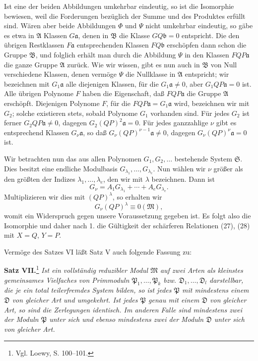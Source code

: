 \documentclass[11pt]{article}
\newcommand{\mM}{\mathfrak{M}}
\newcommand{\mA}{\mathfrak{A}}
\newcommand{\mB}{\mathfrak{B}}
\newcommand{\ma}{\mathfrak{a}}
\newcommand{\mb}{\mathfrak{b}}
\newcommand{\mP}{\mathfrak{P}}
\newcommand{\mS}{\mathfrak{S}}
\newcommand{\mD}{\mathfrak{D}}
\begin{document}
Ist eine der beiden Abbildungen umkehrbar eindeutig, so ist die Isomorphie bewiesen, weil die Forderungen bezüglich der Summe und des Produktes erfüllt sind. Wären aber beide Abbildungen $\Phi$ und $\Psi$ nicht umkehrbar eindeutig, so gäbe es etwa in $\mA$ Klassen $G\ma$, denen in $\mB$ die Klasse $GQ\mb=0$ entspricht. Die den übrigen Restklassen $F\ma$ entsprechenden Klassen $FQ\mb$ erschöpfen dann schon die Gruppe $\mB$, und folglich erhält man durch die Abbildung $\Psi$ in den Klassen $FQP\ma$ die ganze Gruppe $\mA$ zurück. Wie wir wissen, gibt es nun auch in $\mB$ von Null verschiedene Klassen, denen vermöge $\Psi$ die Nullklasse in $\mA$ entspricht; wir bezeichnen mit $G_1\ma$ alle diejenigen Klassen, für die $G_1\ma\ne0$, aber $G_1QP\ma=0$ ist. Alle übrigen Polynome $F$ haben die Eigenschaft, daß $FQP\ma$ die Gruppe $\mA$ erschöpft. Diejenigen Polynome $F$, für die $FQP\ma=G_1\ma$ wird, bezeichnen wir mit $G_2$; solche existieren stets, sobald Polynome $G_1$ vorhanden sind. Für jedes $G_2$ ist ferner $G_2QP\ma\ne0$, dagegen $G_2(QP)^2\ma=0$. Für jedes ganzzahlige $\nu$ gibt es entsprechend Klassen $G_\nu\ma$, so daß $G_\nu(QP)^{\nu-1}\ma\ne0$, dagegen $G_\nu(QP)^\nu\ma=0$ ist.

Wir betrachten nun das aus allen Polynomen $G_1,G_2,
\ldots$ bestehende System $\mS$. Dies besitzt eine endliche Modulbasis $G_{\lambda_1},\ldots,G_{\lambda_e}$. Nun wählen wir $\nu$ größer als den größten der Indizes $\lambda_1,
\ldots,\lambda_e$, den wir mit $\lambda$ bezeichnen. Dann ist
\[
 G_\nu=A_1G_{\lambda_1}+\cdots+A_eG_{\lambda_e}.
\]
Multiplizieren wir dies mit $(QP)^\lambda$, so erhalten wir
\[
 G_\nu(QP)^\lambda\equiv0(\mM),
\]
womit ein Widerspruch gegen unsere Voraussetzung gegeben ist. Es folgt also die Isomorphie und daher nach 1. die Gültigkeit der schärferen Relationen (27), (28) mit $X=Q$, $Y=P$.

Vermöge des Satzes VI läßt Satz V auch folgende Fassung zu:

\textbf{Satz VII.}\footnote{Vgl. Loewy, S. 100--101.} \emph{Ist ein vollständig reduzibler Modul $\mM$ auf zwei Arten als kleinstes gemeinsames Vielfaches von Primmoduln $\mP_1,\ldots,\mP_k$ bzw. $\mD_1,\ldots,\mD_l$ darstellbar, die je ein total teilerfremdes System bilden, so ist jedes $\mP$ mit mindestens einem $\mD$ von gleicher Art und umgekehrt. Ist jedes $\mP$ genau mit einem $\mD$ von gleicher Art, so sind die Zerlegungen identisch. Im anderen Falle sind mindestens zwei der Moduln $\mP$ unter sich und ebenso mindestens zwei der Moduln $\mD$ unter sich von gleicher Art.}
\end{document}
